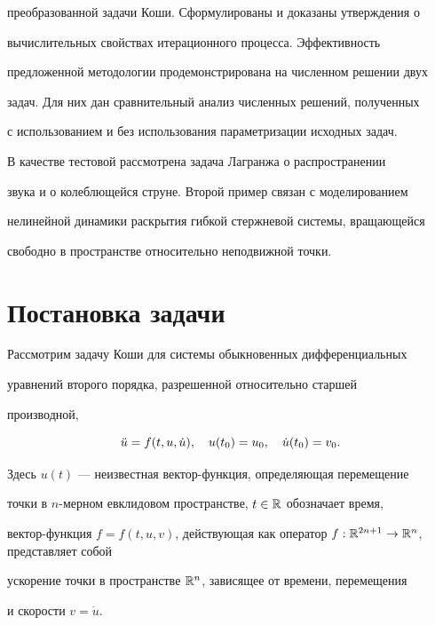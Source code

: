 преобразованной задачи Коши. Сформулированы и доказаны утверждения о 


вычислительных свойствах итерационного процесса. Эффективность 


предложенной методологии продемонстрирована на численном решении двух 


задач. Для них дан сравнительный анализ численных решений, полученных 


с использованием и без использования параметризации исходных задач. 


В качестве тестовой рассмотрена задача Лагранжа о распространении 


звука и о колеблющейся струне. Второй пример связан с моделированием 


нелинейной динамики раскрытия гибкой стержневой системы, вращающейся 


свободно в пространстве относительно неподвижной точки. 


 


\section{Постановка задачи} 


 


Рассмотрим задачу Коши для системы обыкновенных дифференциальных 


уравнений второго порядка, разрешенной относительно старшей 


производной, 


\begin{equation} 


\Ddot u=f(t,u,\Dot u),\quad u(t_0)=u_0,\quad \Dot u(t_0)=v_0. 


\end{equation} 


Здесь $u(t)$ --- неизвестная вектор-функция, определяющая перемещение 


точки в $n$-мерном евклидовом пространстве, $t\in\Bbb R$ обозначает время, 


вектор-функция $f=f(t,u,v)$, действующая как оператор $f:\Bbb R^{2n+1} 


\to\Bbb R^n$, представляет собой 


ускорение точки в пространстве $\Bbb R^n$, зависящее от времени, перемещения 


и скорости $v=\Dot u$. 


